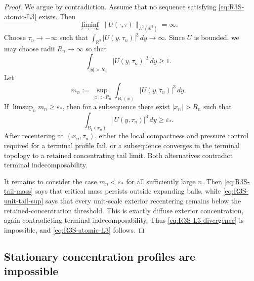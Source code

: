 \documentclass[11pt]{amsart}
\numberwithin{equation}{section}
\theoremstyle{plain}
\theoremstyle{definition}
\theoremstyle{remark}
\begin{document}
\begin{proof}
We argue by contradiction.  Assume that no sequence satisfying
\eqref{eq:R3S-atomic-L3} exists.  Then
\begin{equation}\label{eq:R3S-L3-divergence}
   \liminf_{\tau\to-\infty}\|U(\cdot,\tau)\|_{L^3(\mathbb R^3)}=\infty .
\end{equation}
Choose \(\tau_n\to-\infty\) such that
\(
   \int_{\mathbb R^3}|U(y,\tau_n)|^3\,dy\to\infty .
\)
Since \(U\) is bounded, we may choose radii \(R_n\to\infty\) so that
\begin{equation}\label{eq:R3S-tail-mass}
   \int_{|y|>R_n}|U(y,\tau_n)|^3\,dy\ge 1 .
\end{equation}
Let
\begin{equation}\label{eq:R3S-unit-tail-sup}
   m_n:=\sup_{|x|>R_n}\int_{B_1(x)}|U(y,\tau_n)|^3\,dy .
\end{equation}
If \(\limsup_n m_n\ge\varepsilon_*\), then for a subsequence there exist
\(|x_n|>R_n\) such that
\begin{equation}\label{eq:R3S-active-tail-cube}
   \int_{B_1(x_n)}|U(y,\tau_n)|^3\,dy\ge \varepsilon_* .
\end{equation}
After recentering at \((x_n,\tau_n)\), either the local compactness and pressure
control required for a terminal profile fail, or a subsequence converges in the
terminal topology to a retained concentrating tail limit.  Both alternatives
contradict terminal indecomposability.

It remains to consider the case \(m_n<\varepsilon_*\) for all sufficiently large
\(n\).  Then \eqref{eq:R3S-tail-mass} says that critical mass persists outside
expanding balls, while \eqref{eq:R3S-unit-tail-sup} says that every unit-scale
exterior recentering remains below the retained-concentration threshold.  This
is exactly diffuse exterior concentration, again contradicting terminal
indecomposability.
Thus \eqref{eq:R3S-L3-divergence} is impossible, and
\eqref{eq:R3S-atomic-L3} follows.
\end{proof}

\subsection{Stationary concentration profiles are impossible}
\end{document}
